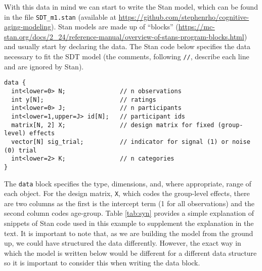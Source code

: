 \documentclass[
  english,
  ,man,floatsintext]{apa6}
\begin{document}
With this data in mind we can start to write the Stan model, which can be found in the file \texttt{SDT\_m1.stan} (available at \url{https://github.com/stephenrho/cognitive-aging-modeling}). Stan models are made up of \enquote{blocks} (\url{https://mc-stan.org/docs/2_24/reference-manual/overview-of-stans-program-blocks.html}) and usually start by declaring the data. The Stan code below specifies the data necessary to fit the SDT model (the comments, following \texttt{//}, describe each line and are ignored by Stan).

\begin{verbatim}
data {
  int<lower=0> N;               // n observations
  int y[N];                     // ratings
  int<lower=0> J;               // n participants
  int<lower=1,upper=J> id[N];   // participant ids
  matrix[N, 2] X;               // design matrix for fixed (group-level) effects
  vector[N] sig_trial;          // indicator for signal (1) or noise (0) trial
  int<lower=2> K;               // n categories
}
\end{verbatim}

The \texttt{data} block specifies the type, dimensions, and, where appropriate, range of each object. For the design matrix, \texttt{X}, which codes the group-level effects, there are two columns as the first is the intercept term (1 for all observations) and the second column codes age-group. Table \ref{tab:syn} provides a simple explanation of snippets of Stan code used in this example to supplement the explanation in the text. It is important to note that, as we are building the model from the ground up, we could have structured the data differently. However, the exact way in which the model is written below would be different for a different data structure so it is important to consider this when writing the data block.
\end{document}
